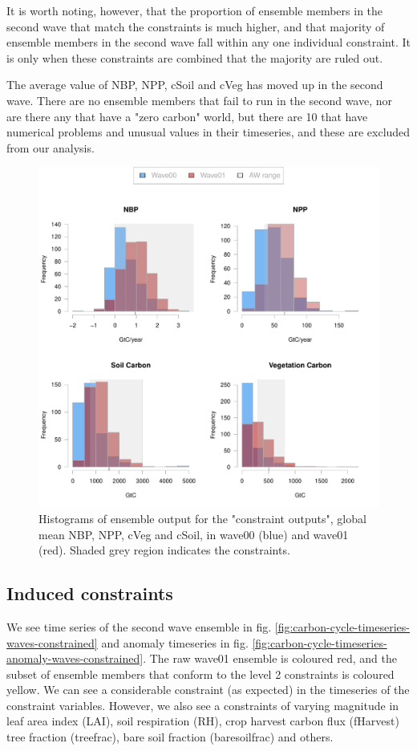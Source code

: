 \documentclass[gmd, manuscript]{copernicus}
\begin{document}
It is worth noting, however, that the proportion of ensemble members in the second wave that match the constraints is much higher, and that majority of ensemble members in the second wave fall within any one individual constraint. It is only when these constraints are combined that the majority are ruled out.

The average value of NBP, NPP, cSoil and cVeg has moved up in the second wave. There are no ensemble members that fail to run in the second wave, nor are there any that have a "zero carbon" world, but there are 10 that have numerical problems and unusual values in their timeseries, and these are excluded from our analysis.

\begin{figure}[t]
\includegraphics[width=12cm]{./graphics/level_2_constraints_hists.pdf}
\caption{Histograms of ensemble output for the "constraint outputs", global mean NBP, NPP, cVeg and cSoil, in wave00 (blue) and wave01 (red). Shaded grey region indicates the constraints.}
\label{fig:level_2_constraints_hists}
\end{figure}
 
\subsection{Induced constraints}\label{ssec:induced_constraints}

We see time series of the second wave ensemble in fig. \ref{fig:carbon-cycle-timeseries-waves-constrained} and anomaly timeseries in fig. \ref{fig:carbon-cycle-timeseries-anomaly-waves-constrained}. The raw wave01 ensemble is coloured red, and the subset of ensemble members that conform to the level 2 constraints is coloured yellow. We can see a considerable constraint (as expected) in the timeseries of the constraint variables. However, we also see a constraints of varying magnitude in leaf area index (LAI), soil respiration (RH), crop harvest carbon flux (fHarvest) tree fraction (treefrac), bare soil fraction (baresoilfrac) and others.
\end{document}
